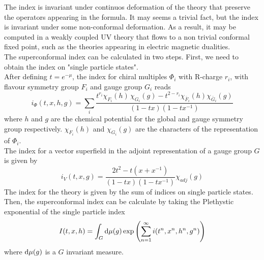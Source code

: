 The index is invariant under continuos deformation of the theory that preserve the operators appearing in the formula.
It may seems a trivial fact, but the index is invariant under some non-conformal deformation.
As a result, it may be computed in a weakly coupled UV theory that flows to a non trivial conformal fixed point, such as the theories appearing in electric magnetic dualities. \\
The superconformal index can be calculated in two steps.
First, we need to obtain the index on "single particle states".\\
After defining $t = e^{-\mu}$, the index for chiral multiples $\Phi_i$ with R-charge $r_i$, with flavour symmetry group $F_i$ and gauge group $G_i$ reads
\begin{equation}
i_{\Phi}(t,x,h,g) = \sum_{i} \frac{ t^{r_i} \chi_{F_i}(h) \, \chi_{G_i}(g) - t^{2-r_i} \chi_{\bar{F}_i}(h) \chi_{\bar{G}_i}(g)}{ (1-tx) (1- t x^{-1})}
\end{equation}
where $h$ and $g$ are the chemical potential for the global and gauge symmetry group respectively. $\chi_{F_i}(h)$ and $\chi_{G_i}(g)$ are the characters of the representation of $\Phi_i$.\\
The index for a vector superfield in the adjoint representation of a gauge group $G$ is given by
\begin{equation}
i_{V} (t,x,g) = \frac{2 t^2 - t(x + x^{-1})}{(1-tx) (1 - tx^{-1})} \chi_{adj}(g)
\end{equation}
The index for the theory is given by the sum of indices on single particle states. 
Then, the superconformal index can be calculate by taking the Plethystic exponential \cite{Feng:2007ur} of the single particle index
\begin{equation}
  I(t,x,h) = \int_{G} \hbox{d} \mu(g) \exp{ \left(  \sum_{n=1}^{\infty}i(t^n,x^n,h^n,g^n) \right)}
  \end{equation}  
  where $\hbox{d} \mu(g)$ is a $G$ invariant measure.\\


